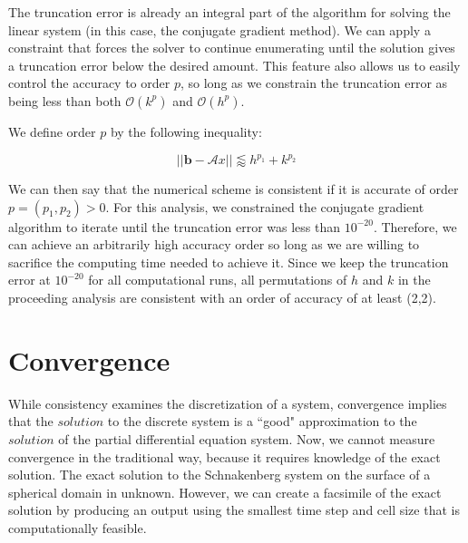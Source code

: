 \documentclass[12pt]{article}
\begin{document}
The truncation error is already an integral part of the algorithm for solving the linear system (in this case, the conjugate gradient method). We can apply a constraint that forces the solver to continue enumerating until the solution gives a truncation error below the desired amount. This feature also allows us to easily control the accuracy to order $p$, so long as we constrain the truncation error as being less than both $\mathcal{O}(k^p)$ and $\mathcal{O}(h^p)$. 

We define order $p$ by the following inequality:

\begin{equation}
	||\textbf{b}-\mathcal{A}x|| \lessapprox h^{p_1}+k^{p_2}
\end{equation}

We can then say that the numerical scheme is consistent if it is accurate of order $p=(p_1,p_2)>0$. For this analysis, we constrained the conjugate gradient algorithm to iterate until the truncation error was less than $10^{-20}$. Therefore, we can achieve an arbitrarily high accuracy order so long as we are willing to sacrifice the computing time needed to achieve it. Since we keep the truncation error at $10^{-20}$ for all computational runs, all permutations of $h$ and $k$ in the proceeding analysis are consistent with an order of accuracy of at least (2,2). 























\section{Convergence}

While consistency examines the discretization of a system, convergence implies that the $solution$ to the discrete system is a ``good" approximation to the $solution$ of the partial differential equation system. Now, we cannot measure convergence in the traditional way, because it requires knowledge of the exact solution. The exact solution to the Schnakenberg system on the surface of a spherical domain in unknown. However, we can create a facsimile of the exact solution by producing an output using the smallest time step and cell size that is computationally feasible. 
\end{document}
